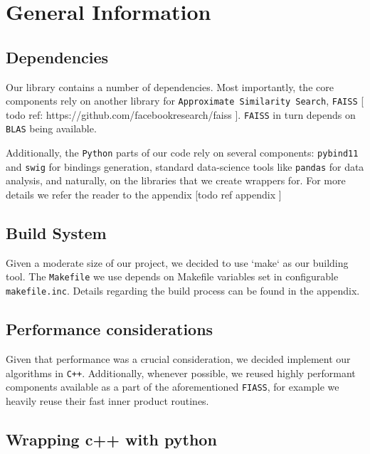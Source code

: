 
\section{General Information}

        
    \subsection{Dependencies}
    
        Our library contains a number of dependencies. Most importantly, the core components rely on 
        another library for \texttt{Approximate Similarity Search}, \texttt{FAISS} [ todo ref: https://github.com/facebookresearch/faiss ].
        \texttt{FAISS} in turn depends on \texttt{BLAS} being available. 
        
        Additionally, the \texttt{Python} parts of our code rely on several components: \texttt{pybind11} and \texttt{swig}
        for bindings generation, standard data-science tools like \texttt{pandas} for data analysis, and naturally, on the 
        libraries that we create wrappers for. For more details we refer the reader to the appendix [todo ref appendix ]
    
    \subsection{Build System}
        
        Given a moderate size of our project, we decided to use `make` as our building tool. The \texttt{Makefile} we use
        depends on Makefile variables set in configurable \texttt{makefile.inc}. Details regarding the build process can be found in the appendix.
        
    \subsection{Performance considerations}
        
        Given that performance was a crucial consideration, we decided implement our algorithms in \texttt{C++}.
        Additionally, whenever possible, we reused highly performant components available as a part of the aforementioned \texttt{FIASS}, 
        for example we heavily reuse their fast inner product routines. 
        
    \subsection{Wrapping c++ with python}    
        
